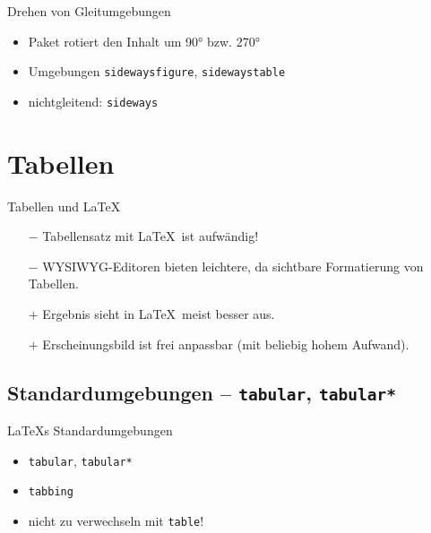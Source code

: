 \documentclass[
	vorläufig=false,
	datum=2018-11-05,
	titel={Gleitumgebungen und Tabellen},
	web=false,
	noshortverb=true,
	aspectratio=1610,
	max,
]{../tex/latexkurs-slides}
\begin{document}
\begin{frame}[fragile]{Drehen von Gleitumgebungen}
\begin{itemize}
\item Paket  rotiert den Inhalt um 90° bzw. 270°
\item Umgebungen \verb/sidewaysfigure/, \verb/sidewaystable/
\item nichtgleitend: \verb/sideways/
\end{itemize}
\begin{LTXexample}[width=.4\textwidth]
\centering
\begin{sideways}
[Bild]
\end{sideways}
\end{LTXexample}
\end{frame}


\section{Tabellen}
\begin{frame}{Tabellen und \LaTeX}
\begin{itemize}
\item[$\pmb-$] Tabellensatz mit \LaTeX\ ist aufwändig!
\item[$\pmb-$] WYSIWYG-Editoren bieten leichtere, da sichtbare Formatierung von Tabellen.
\item[$\pmb+$] Ergebnis sieht in \LaTeX\ meist besser aus.
\item[$\pmb+$] Erscheinungsbild ist frei anpassbar (mit beliebig hohem Aufwand).
\end{itemize}
\end{frame}

\subsection[tabular]{Standardumgebungen – \texttt{tabular}, \texttt{tabular*}}
\begin{frame}[fragile]{\LaTeX{}s Standardumgebungen}
\begin{itemize}
\item \verb/tabular/, \verb/tabular*/
\item \verb/tabbing/
\item \alert{nicht zu verwechseln mit \texttt{table}!}
\end{itemize}
\end{frame}
\end{document}
